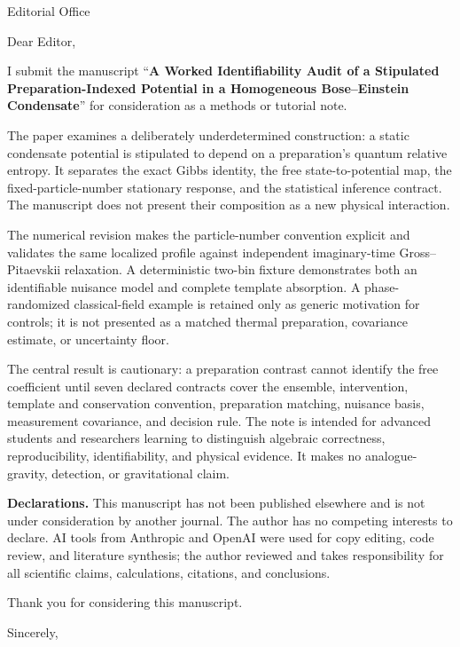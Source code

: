 \documentclass[10pt]{letter}
\date{August 28, 2026}
\begin{document}
\begin{letter}{Editorial Office}

\opening{Dear Editor,}

I submit the manuscript ``\textbf{A Worked Identifiability Audit of a Stipulated Preparation-Indexed Potential in a Homogeneous Bose--Einstein Condensate}'' for consideration as a methods or tutorial note.

The paper examines a deliberately underdetermined construction: a static condensate potential is stipulated to depend on a preparation's quantum relative entropy. It separates the exact Gibbs identity, the free state-to-potential map, the fixed-particle-number stationary response, and the statistical inference contract. The manuscript does not present their composition as a new physical interaction.

The numerical revision makes the particle-number convention explicit and validates the same localized profile against independent imaginary-time Gross--Pitaevskii relaxation. A deterministic two-bin fixture demonstrates both an identifiable nuisance model and complete template absorption. A phase-randomized classical-field example is retained only as generic motivation for controls; it is not presented as a matched thermal preparation, covariance estimate, or uncertainty floor.

The central result is cautionary: a preparation contrast cannot identify the free coefficient until seven declared contracts cover the ensemble, intervention, template and conservation convention, preparation matching, nuisance basis, measurement covariance, and decision rule. The note is intended for advanced students and researchers learning to distinguish algebraic correctness, reproducibility, identifiability, and physical evidence. It makes no analogue-gravity, detection, or gravitational claim.

\textbf{Declarations.} This manuscript has not been published elsewhere and is not under consideration by another journal. The author has no competing interests to declare. AI tools from Anthropic and OpenAI were used for copy editing, code review, and literature synthesis; the author reviewed and takes responsibility for all scientific claims, calculations, citations, and conclusions.

Thank you for considering this manuscript.

\closing{Sincerely,}

\end{letter}
\end{document}
